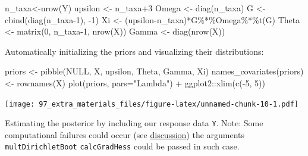 \documentclass[
]{book}
\newenvironment{Shaded}{\begin{snugshade}}{\end{snugshade}}
\newcommand{\AttributeTok}[1]{\textcolor[rgb]{0.77,0.63,0.00}{#1}}
\newcommand{\ConstantTok}[1]{\textcolor[rgb]{0.00,0.00,0.00}{#1}}
\newcommand{\DecValTok}[1]{\textcolor[rgb]{0.00,0.00,0.81}{#1}}
\newcommand{\FunctionTok}[1]{\textcolor[rgb]{0.00,0.00,0.00}{#1}}
\newcommand{\NormalTok}[1]{#1}
\newcommand{\OtherTok}[1]{\textcolor[rgb]{0.56,0.35,0.01}{#1}}
\newcommand{\SpecialCharTok}[1]{\textcolor[rgb]{0.00,0.00,0.00}{#1}}
\newcommand{\StringTok}[1]{\textcolor[rgb]{0.31,0.60,0.02}{#1}}
\begin{document}
\begin{Shaded}
\begin{Highlighting}[]
\NormalTok{n\_taxa}\OtherTok{\textless{}{-}}\FunctionTok{nrow}\NormalTok{(Y)}
\NormalTok{upsilon }\OtherTok{\textless{}{-}}\NormalTok{ n\_taxa}\SpecialCharTok{+}\DecValTok{3}
\NormalTok{Omega }\OtherTok{\textless{}{-}} \FunctionTok{diag}\NormalTok{(n\_taxa)}
\NormalTok{G }\OtherTok{\textless{}{-}} \FunctionTok{cbind}\NormalTok{(}\FunctionTok{diag}\NormalTok{(n\_taxa}\DecValTok{{-}1}\NormalTok{), }\SpecialCharTok{{-}}\DecValTok{1}\NormalTok{)}
\NormalTok{Xi }\OtherTok{\textless{}{-}}\NormalTok{ (upsilon}\SpecialCharTok{{-}}\NormalTok{n\_taxa)}\SpecialCharTok{*}\NormalTok{G}\SpecialCharTok{\%*\%}\NormalTok{Omega}\SpecialCharTok{\%*\%}\FunctionTok{t}\NormalTok{(G)}
\NormalTok{Theta }\OtherTok{\textless{}{-}} \FunctionTok{matrix}\NormalTok{(}\DecValTok{0}\NormalTok{, n\_taxa}\DecValTok{{-}1}\NormalTok{, }\FunctionTok{nrow}\NormalTok{(X))}
\NormalTok{Gamma }\OtherTok{\textless{}{-}} \FunctionTok{diag}\NormalTok{(}\FunctionTok{nrow}\NormalTok{(X))}
\end{Highlighting}
\end{Shaded}

Automatically initializing the priors and visualizing their distributions:

\begin{Shaded}
\begin{Highlighting}[]
\NormalTok{priors }\OtherTok{\textless{}{-}} \FunctionTok{pibble}\NormalTok{(}\ConstantTok{NULL}\NormalTok{, X, upsilon, Theta, Gamma, Xi)}
\FunctionTok{names\_covariates}\NormalTok{(priors) }\OtherTok{\textless{}{-}} \FunctionTok{rownames}\NormalTok{(X)}
\FunctionTok{plot}\NormalTok{(priors, }\AttributeTok{pars=}\StringTok{"Lambda"}\NormalTok{) }\SpecialCharTok{+}\NormalTok{ ggplot2}\SpecialCharTok{::}\FunctionTok{xlim}\NormalTok{(}\FunctionTok{c}\NormalTok{(}\SpecialCharTok{{-}}\DecValTok{5}\NormalTok{, }\DecValTok{5}\NormalTok{))}
\end{Highlighting}
\end{Shaded}

\texttt{[image: 97\_extra\_materials\_files/figure-latex/unnamed-chunk-10-1.pdf]}

Estimating the posterior by including our response data \texttt{Y}.
Note: Some computational failures could occur (see \href{https://github-wiki-see.page/m/jsilve24/fido/wiki/Frequently-Asked-Questions}{discussion})
the arguments \texttt{multDirichletBoot} \texttt{calcGradHess} could be passed in such case.
\end{document}
